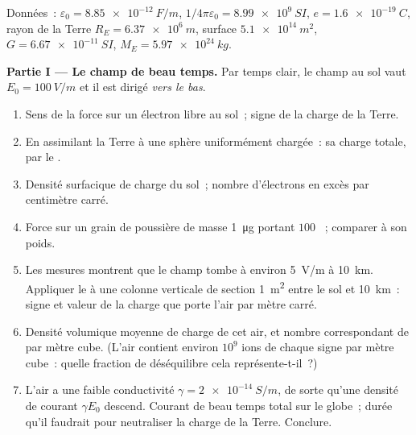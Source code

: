 \begin{problem}
\label{pb:b1:electrostatics-gauss:1}
Données~: $\varepsilon_0 = \qty{8.85e-12}{F/m}$, $1/4\pi\varepsilon_0 = \qty{8.99e9}{SI}$,
$e = \qty{1.6e-19}{C}$, rayon de la Terre $R_E = \qty{6.37e6}{m}$, surface
$\qty{5.1e14}{m^2}$, $G = \qty{6.67e-11}{SI}$, $M_E = \qty{5.97e24}{kg}$.

\medskip
\noindent\textbf{Partie I --- Le champ de beau temps.}
Par temps clair, le champ au sol vaut $E_0 = \qty{100}{V/m}$ et il est dirigé
\emph{vers le bas}.
\begin{enumerate}
  \item Sens de la force sur un électron libre au sol~; signe de la charge
        de la Terre.
  \item En assimilant la Terre à une sphère uniformément chargée~: sa charge
        totale, par le .
  \item Densité surfacique de charge du sol~; nombre d'électrons en excès par
        centimètre carré.
  \item Force sur un grain de poussière de masse \qty{1}{\micro g} portant
        $100$ ~; comparer à son poids.
  \item Les mesures montrent que le champ tombe à environ \qty{5}{V/m} à
        \qty{10}{km}. Appliquer le  à une colonne verticale
        de section \qty{1}{m^2} entre le sol et \qty{10}{km}~: signe et
        valeur de la charge que porte l'air par mètre carré.
  \item Densité volumique moyenne de charge de cet air, et nombre
        correspondant de  par mètre cube. (L'air contient
        environ $10^9$ ions de chaque signe par mètre cube~: quelle fraction
        de déséquilibre cela représente-t-il~?)
  \item L'air a une faible conductivité $\gamma = \qty{2e-14}{S/m}$, de sorte
        qu'une densité de courant $\gamma E_0$ descend. Courant de beau temps
        total sur le globe~; durée qu'il faudrait pour neutraliser la charge
        de la Terre. Conclure.
\end{enumerate}


\end{problem}

